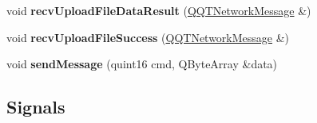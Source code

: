 \begin{DoxyCompactItemize}
void {\bfseries recv\+Upload\+File\+Data\+Result} (\mbox{\hyperlink{class_q_q_t_network_message}{Q\+Q\+T\+Network\+Message}} \&)
\item 
\mbox{\label{class_q_q_t_cloud_protocol_a71d613fc619afe1c9b7feef9e0a1bf0e}} 
void {\bfseries recv\+Upload\+File\+Success} (\mbox{\hyperlink{class_q_q_t_network_message}{Q\+Q\+T\+Network\+Message}} \&)
\item 
\mbox{\label{class_q_q_t_cloud_protocol_a6ddbd224b7bff425343225b08b08a101}} 
void {\bfseries send\+Message} (quint16 cmd, Q\+Byte\+Array \&data)
\end{DoxyCompactItemize}
\subsection*{Signals}
